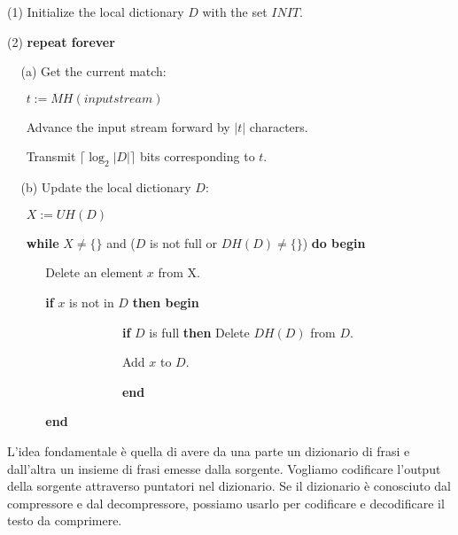 \begin{mdframed}[backgroundcolor=gray!20,shadow=false]

(1) Initialize the local dictionary \(D\) with the set \(INIT\).

\vspace{3mm}

(2) \textbf{repeat forever}

\vspace{3mm}

\(\>\>\>\>\>\)(a) Get the current match:

\(\>\>\>\>\>\>\>\)\(t := MH(inputstream)\)

\(\>\>\>\>\>\>\>\)Advance the input stream forward by \(|t|\) characters.

\(\>\>\>\>\>\>\>\)Transmit \(\lceil \log_2 |D| \rceil\) bits corresponding to \(t\).

\vspace{3mm}

\(\>\>\>\>\>\)(b) Update the local dictionary \(D\):

\(\>\>\>\>\>\>\>\)\(X := UH(D)\)

\(\>\>\>\>\>\>\>\)\textbf{while} \(X \neq \{\}\) and (\(D\) is not full or \(DH(D) \neq \{\}\)) \textbf{do begin}

\(\>\>\>\>\>\>\>\>\>\>\>\>\>\>\)Delete an element \(x\) from X.

\(\>\>\>\>\>\>\>\>\>\>\>\>\>\>\)\textbf{if} \(x\) is not in \(D\) \textbf{then begin}

\(\>\>\>\>\>\>\>\>\>\>\>\>\>\>\)\(\>\>\>\>\>\>\>\>\>\>\>\>\>\>\)\(\>\>\>\>\>\>\>\>\>\>\>\>\>\>\)\textbf{if} \(D\) is full \textbf{then} Delete \(DH(D)\) from \(D\).

\(\>\>\>\>\>\>\>\>\>\>\>\>\>\>\)\(\>\>\>\>\>\>\>\>\>\>\>\>\>\>\)\(\>\>\>\>\>\>\>\>\>\>\>\>\>\>\)Add \(x\) to \(D\).

\(\>\>\>\>\>\>\>\>\>\>\>\>\>\>\)\(\>\>\>\>\>\>\>\>\>\>\>\>\>\>\)\(\>\>\>\>\>\>\>\>\>\>\>\>\>\>\)\textbf{end}

\(\>\>\>\>\>\>\>\>\>\>\>\>\>\>\)\textbf{end}
\end{mdframed}

\vspace{5mm}

L'idea fondamentale è quella di avere da una parte un dizionario di frasi e dall'altra un insieme di frasi emesse dalla sorgente. Vogliamo codificare l'output della sorgente attraverso puntatori nel dizionario. Se il dizionario è conosciuto dal compressore e dal decompressore, possiamo usarlo per codificare e decodificare il testo da comprimere.

